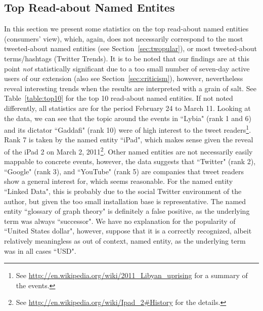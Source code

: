 \documentclass[runningheads,a4paper]{llncs}
\begin{document}
\subsection{Top Read-about Named Entites}
In this section we present some statistics on the top read-about named entities (consumers' view), which, again, does not necessarily correspond to the most tweeted-about named entities (see Section~\ref{sec:twopular}), or most tweeted-about terms/hashtags (Twitter Trends). It is to be noted that our findings are at this point \textit{not} statistically significant due to a too small number of seven-day active users of our extension (also see Section~\ref{sec:criticism}), however, nevertheless reveal interesting trends when the results are interpreted with a grain of salt. See Table~\ref{table:top10} for the top 10 read-about named entities. If not noted differently, all statistics are for the period February 24 to March 11. Looking at the data, we can see that the topic around the events in ``Lybia" (rank 1 and 6) and its dictator ``Gaddafi" (rank 10) were of high interest to the tweet readers\footnote{See \url{http://en.wikipedia.org/wiki/2011_Libyan_uprising} for a summary of the events.}. Rank 7 is taken by the named entity ``iPad", which makes sense given the reveal of the iPad 2 on March 2, 2011\footnote{See \url{http://en.wikipedia.org/wiki/Ipad_2#History} for the details.}. Other named entities are not necessarily easily mappable to concrete events, however, the data suggests that ``Twitter" (rank 2), ``Google" (rank 3), and ``YouTube" (rank 5) are companies that tweet readers show a general interest for, which seems reasonable. For the named entity ``Linked Data", this is probably due to the social Twitter environment of the author, but given the too small installation base is representative. The named entity ``glossary of graph theory" is definitely a false positive, as the underlying term was always ``successor". We have no explanation for the popularity of ``United States dollar", however, suppose that it is a correctly recognized, albeit relatively meaningless as out of context, named entity, as the underlying term was in all cases ``USD".
\end{document}
